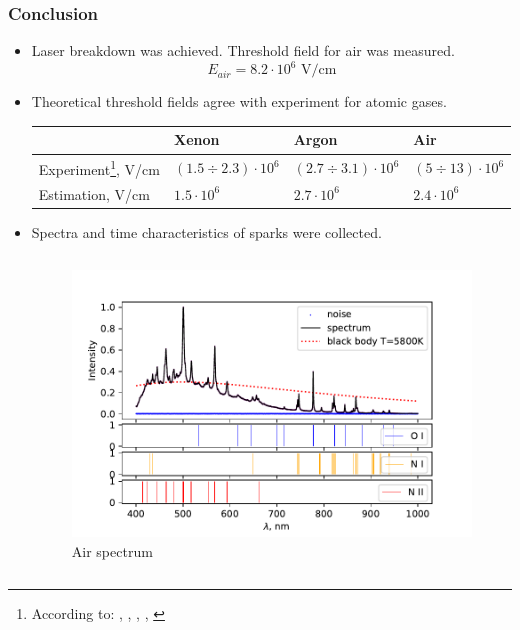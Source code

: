\documentclass{beamer}
\begin{document}
	\begin{frame}
		\frametitle{Conclusion}
		\begin{itemize}
			\item Laser breakdown was achieved. Threshold field for air was measured.
				  $$ E_{air} = 8.2 \cdot 10^6 \text{ V/cm}$$
			\item Theoretical threshold fields agree with experiment for atomic gases.
			\footnotesize
			\begin{table}[]
				\begin{tabular}{llll}
					\hline
					& Xenon            & Argon            & Air              \\ \hline
					Experiment\footnote{According to: \cite{raizer}, \cite{argon_threshold}, \cite{xenon_threshold}, \cite{air_breakdown}, \cite{air_threshold}}, V/cm & $(1.5 \div 2.3) \cdot 10^6$ & $(2.7 \div 3.1) \cdot 10^6$ & $(5 \div 13) \cdot 10^6$ \\
					Estimation, V/cm & $1.5 \cdot 10^6$ & $2.7 \cdot 10^6$ & $2.4 \cdot 10^6$ \\ \hline
				\end{tabular}
			\end{table}
			
			\item 
			\normalsize Spectra and time characteristics of sparks were collected.
			\begin{columns}
				\begin{figure}
					\centering
					\includegraphics[width=\linewidth]{gen/air_lines.pdf}
					\caption*{Air spectrum}
				\end{figure}
				

\end{columns}
\end{itemize}
\end{frame}
\end{document}
